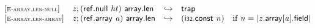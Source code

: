 \vspace{1ex}

$$
\begin{array}{@{}l@{}lcl@{}l@{}}
{[\textsc{\scriptsize E{-}array.len{-}null}]} \quad & {\mathit{z}} ; (\mathsf{ref.null}~{\mathit{ht}})~\mathsf{array.len} &\hookrightarrow& \mathsf{trap} &  \\
{[\textsc{\scriptsize E{-}array.len{-}array}]} \quad & {\mathit{z}} ; (\mathsf{ref.array}~{\mathit{a}})~\mathsf{array.len} &\hookrightarrow& (\mathsf{i{\scriptstyle32}}.\mathsf{const}~{\mathit{n}}) &\quad
  \mbox{if}~{\mathit{n}} = {|{\mathit{z}}.\mathsf{array}[{\mathit{a}}].\mathsf{field}|} \\
\end{array}
$$

\vspace{1ex}

